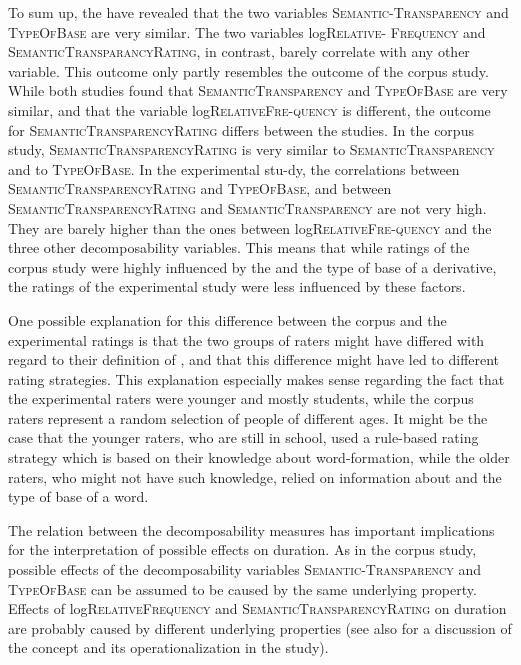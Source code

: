  
 To sum up, the  have revealed that the two variables \textsc{Semantic-Transparency} and \textsc{TypeOfBase} are very similar. The two variables log\textsc{Relative- Frequency} and \textsc{SemanticTransparancyRating}, in contrast, barely correlate with any other  variable.
This outcome only partly resembles the outcome of the corpus study. While both studies found that \textsc{SemanticTransparency} and \textsc{TypeOfBase} are very similar, and that the variable log\textsc{RelativeFre-quency} is different, the outcome for \textsc{SemanticTransparencyRating} differs between the studies. 
In the corpus study, \textsc{SemanticTransparencyRating} is very similar to \textsc{SemanticTransparency} and to \textsc{TypeOfBase}. In the experimental stu-dy, the correlations between \textsc{SemanticTransparencyRating} and \textsc{TypeOfBase}, and between \textsc{SemanticTransparencyRating}  and \textsc{SemanticTransparency} are not very high. They are barely higher than the ones between log\textsc{RelativeFre-quency} and the three other decomposability variables. 
This means that while ratings of the corpus study were highly influenced by the  and the type of base of a derivative, the ratings of the experimental study were less influenced by these factors.

 
 One possible explanation for this difference between the corpus and the experimental ratings is that the two groups of raters might have differed with regard to their definition of , and that this difference might have led to different rating strategies. This explanation especially makes sense regarding the fact that the experimental raters were younger and mostly students, while the corpus raters represent a random selection of people of different ages. It might be the case that the younger raters, who are still in school, used a rule-based rating strategy which is based on their knowledge about word-formation, while the older raters, who might not have such knowledge, relied on information about  and the type of base of a word. 

 The relation between the decomposability measures has important implications for the interpretation of possible  effects on duration. As in the corpus study, possible effects of the decomposability variables \textsc{Semantic-Transparency} and \textsc{TypeOfBase} can be assumed to be caused by the same underlying property. 
 Effects of log\textsc{RelativeFrequency} and \textsc{SemanticTransparencyRating} on duration are probably caused by different underlying properties (see also  for a discussion of the concept  and its operationalization in the study).
 





